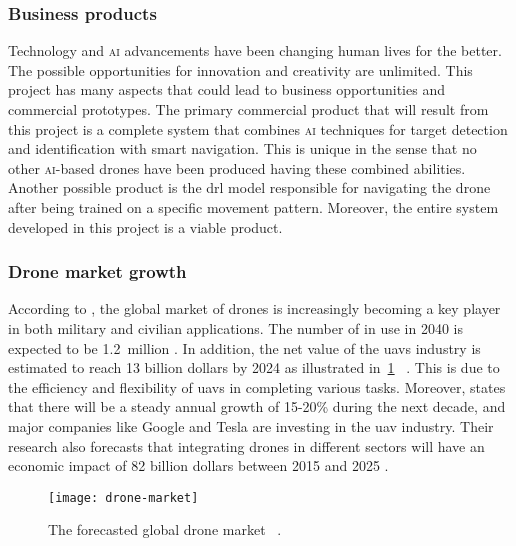 \subsubsection{Business products}
        Technology and \textsc{ai} advancements have been changing human lives for the better.
	The possible opportunities for innovation and creativity are unlimited. This
	project has many aspects that could lead to business opportunities and commercial
	prototypes. 
        The primary commercial product that 
        will result from this 
        project is a complete \uav system that combines 
        \textsc{ai} techniques for target detection and
        identification with smart navigation. 
        This is unique in the sense that no other 
        \textsc{ai}-based drones have been produced 
        having these combined abilities.
	Another possible product is the \gls{drl} model responsible for navigating the
	drone after being trained on a specific movement pattern.
	Moreover, the entire system developed in this project is a viable product.
	
\subsubsection{Drone market growth}
	According to \textcite{Atwater15Commercial}, the global market of drones is 
	increasingly becoming a key player in both military and civilian applications. 
        The number of \uavs in use in 2040 is expected to 
        be \SI{1.2}{million} \cite{Amo19}. In addition,
	the net value of the \glspl{uav} industry is estimated to reach 13 billion dollars
	by 2024 as illustrated in~\cref{fig:drone-market}%
        ~\cite{Mic14}. This is due to the efficiency 
	and flexibility of \glspl{uav} in completing various tasks. 
	Moreover, \textcite{Yes19} states that there will be a steady annual growth of 
	15-20\% during the next decade, and major companies like Google and Tesla are investing
	in the \gls{uav} industry. Their research also forecasts that integrating drones in
	different sectors will have an economic impact of 82 billion dollars between 2015 
        and 2025 \cite{Yes19}.
	
\begin{figure}[tbp] 
        \centering
        \texttt{[image: drone-market]}
        \caption[The forecasted global drone market.]
        {The forecasted global drone market~%
        \cite[Fig.~2]{Mic14}.} 
        \label{fig:drone-market} 
\end{figure}
	
